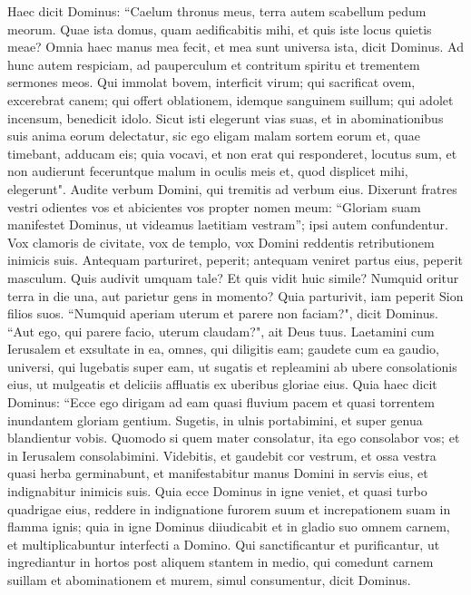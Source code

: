 \begin{biblechapter}  
\verse Haec dicit Dominus: “Caelum thronus meus, terra autem scabellum pedum meorum. Quae ista domus, quam aedificabitis mihi, et quis iste locus quietis meae? 
\verse Omnia haec manus mea fecit, et mea sunt universa ista, dicit Dominus. Ad hunc autem respiciam, ad pauperculum et contritum spiritu et trementem sermones meos. 
\verse Qui immolat bovem, interficit virum; qui sacrificat ovem, excerebrat canem; qui offert oblationem, idemque sanguinem suillum; qui adolet incensum, benedicit idolo. Sicut isti elegerunt vias suas, et in abominationibus suis anima eorum delectatur, 
\verse sic ego eligam malam sortem eorum et, quae timebant, adducam eis; quia vocavi, et non erat qui responderet, locutus sum, et non audierunt feceruntque malum in oculis meis et, quod displicet mihi, elegerunt". 
\verse Audite verbum Domini, qui tremitis ad verbum eius. Dixerunt fratres vestri odientes vos et abicientes vos propter nomen meum: “Gloriam suam manifestet Dominus, ut videamus laetitiam vestram”; ipsi autem confundentur. 
\verse Vox clamoris de civitate, vox de templo, vox Domini reddentis retributionem inimicis suis. 
\verse Antequam parturiret, peperit; antequam veniret partus eius, peperit masculum. 
\verse Quis audivit umquam tale? Et quis vidit huic simile? Numquid oritur terra in die una, aut parietur gens in momento? Quia parturivit, iam peperit Sion filios suos. 
\verse “Numquid aperiam uterum et parere non faciam?", dicit Dominus. “Aut ego, qui parere facio, uterum claudam?", ait Deus tuus. 
\verse Laetamini cum Ierusalem et exsultate in ea, omnes, qui diligitis eam; gaudete cum ea gaudio, universi, qui lugebatis super eam, 
\verse ut sugatis et repleamini ab ubere consolationis eius, ut mulgeatis et deliciis affluatis ex uberibus gloriae eius. 
\verse Quia haec dicit Dominus: “Ecce ego dirigam ad eam quasi fluvium pacem et quasi torrentem inundantem gloriam gentium. Sugetis, in ulnis portabimini, et super genua blandientur vobis. 
\verse Quomodo si quem mater consolatur, ita ego consolabor vos; et in Ierusalem consolabimini. 
\verse Videbitis, et gaudebit cor vestrum, et ossa vestra quasi herba germinabunt, et manifestabitur manus Domini in servis eius, et indignabitur inimicis suis. 
\verse Quia ecce Dominus in igne veniet, et quasi turbo quadrigae eius, reddere in indignatione furorem suum et increpationem suam in flamma ignis; 
\verse quia in igne Dominus diiudicabit et in gladio suo omnem carnem, et multiplicabuntur interfecti a Domino. 
\verse Qui sanctificantur et purificantur, ut ingrediantur in hortos post aliquem stantem in medio, qui comedunt carnem suillam et abominationem et murem, simul consumentur, dicit Dominus. 

\end{biblechapter}
